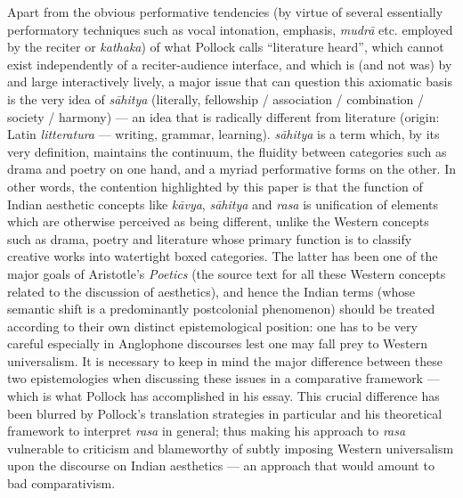 Apart from the obvious performative tendencies (by virtue of several essentially performatory techniques such as vocal intonation, emphasis, \textsl{mudrā} etc. employed by the reciter or \textsl{kathaka}) of what Pollock calls “literature heard”, which cannot exist independently of a reciter-audience interface, and which is (and not was) by and large interactively lively, a major issue that can question this axiomatic basis is the very idea of \textsl{sāhitya} (literally, fellowship / association / combination / society / harmony) --- an idea that is radically different from literature (origin: Latin \textsl{litteratura} --- writing, grammar, learning). \textsl{sāhitya} is a term which, by its very definition, maintains the continuum, the fluidity between categories such as drama and poetry on one hand, and a myriad performative forms on the other. In other words, the contention highlighted by this paper is that the function of Indian aesthetic concepts like \textsl{kāvya}, \textsl{sāhitya} and \textsl{rasa} is unification of elements which are otherwise perceived as being different, unlike the Western concepts such as drama, poetry and literature whose primary function is to classify creative works into watertight boxed categories. The latter has been one of the major goals of Aristotle’s \textsl{Poetics} (the source text for all these Western concepts related to the discussion of aesthetics), and hence the Indian terms (whose semantic shift is a predominantly postcolonial phenomenon) should be treated according to their own distinct epistemological position: one has to be very careful especially in Anglophone discourses lest one may fall prey to Western universalism. It is necessary to keep in mind the major difference between these two epistemologies when discussing these issues in a comparative framework --- which is what Pollock has accomplished in his essay. This crucial difference has been blurred by Pollock’s translation strategies in particular and his theoretical framework to interpret \textsl{rasa} in general; thus making his approach to \textsl{rasa} vulnerable to criticism and blameworthy of subtly imposing Western universalism upon the discourse on Indian aesthetics --- an approach that would amount to bad comparativism.\\[-21pt]

